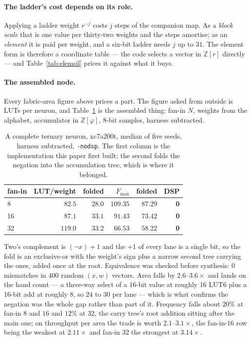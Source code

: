\documentclass[11pt]{article}
\theoremstyle{definition}
\begin{document}
\paragraph{The ladder's cost depends on its role.} Applying a ladder weight
$r^{-j}$ costs $j$ steps of the companion map. As a \emph{block scale} that is
one value per thirty-two weights and the steps amortise; as an \emph{element} it
is paid per weight, and a six-bit ladder needs $j$ up to $31$. The element form
is therefore a coordinate table --- the code selects a vector in
$\mathbb{Z}[r]$ directly --- and Table~\ref{tab:elemsil} prices it against what
it buys.

\paragraph{The assembled node.} Every fabric-area figure above prices a part. The
figure asked from outside is LUTs per neuron, and Table~\ref{tab:node} is the
assembled thing: fan-in $N$, weights from the alphabet, accumulator in
$\mathbb{Z}[\varphi]$, 8-bit samples, harness subtracted.

\begin{table}[t]\centering
\caption{A complete ternary neuron, xc7a200t, median of five seeds, harness
subtracted, \texttt{-nodsp}. The first column is the implementation this paper
first built; the second folds the negation into the accumulation tree, which is
where it belonged.}
\label{tab:node}
\begin{tabular}{lrrrrr}
\toprule
fan-in & LUT/weight & folded & $F_{\max}$ & folded & DSP \\
\midrule
8  & $82.5$ & $\mathbf{28.0}$ & $109.35$ & $87.29$ & \textbf{0} \\
16 & $87.1$ & $\mathbf{33.1}$ & $91.43$ & $73.42$ & \textbf{0} \\
32 & $119.0$ & $\mathbf{33.2}$ & $66.53$ & $58.22$ & \textbf{0} \\
\bottomrule
\end{tabular}
\end{table}

Two's complement is $(\lnot x)+1$ and the $+1$ of every lane is a single bit, so
the fold is an exclusive-or with the weight's sign plus a narrow second tree
carrying the ones, added once at the root. Equivalence was checked before
synthesis: $0$ mismatches in $400$ random $(x,w)$ vectors. Area falls by
$2.6$--$3.6\times$ and lands on the hand count --- a three-way select of a
16-bit value at roughly $16$ LUT6 plus a 16-bit add at roughly $8$, so $24$ to
$30$ per lane --- which is what confirms the negation was the whole gap rather
than part of it. Frequency falls about $20\%$ at fan-in $8$ and $16$ and $12\%$
at $32$, the carry tree's root addition sitting after the main one; on
throughput per area the trade is worth $2.1$--$3.1\times$, the fan-in-$16$ row
being the weakest at $2.11\times$ and fan-in $32$ the strongest at $3.14\times$.
\end{document}
